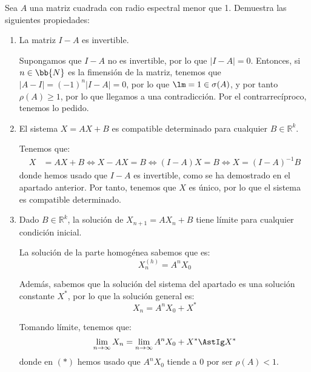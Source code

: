 \begin{ejercicio}
Sea $A$ una matriz cuadrada con radio espectral menor que 1. Demuestra las siguientes propiedades:

\begin{enumerate}
    \item La matriz $I - A$ es invertible.
    
    Supongamos que $I-A$ no es invertible, por lo que $|I-A|=0$.
    Entonces, si $n\in \bb{N}$ es la fimensión de la matriz, tenemos que $|A-I|=(-1)^n|I-A| = 0$,
    por lo que $\lm=1\in \sigma(A)$, y por tanto $\rho(A)\geq 1$, por lo que llegamos a una contradicción.
    Por el contrarrecíproco, tenemos lo pedido.
    \item El sistema $X = AX + B$ es compatible determinado para cualquier $B \in \mathbb{R}^k$.
    
    Tenemos que:
    \begin{align*}
        X &= AX + B \Longleftrightarrow
        X - AX = B \Longleftrightarrow
        (I - A)X = B \Longleftrightarrow
        X = (I - A)^{-1}B
    \end{align*}
    donde hemos usado que $I - A$ es invertible, como se ha demostrado en el apartado anterior.
    Por tanto, tenemos que $X$ es único, por lo que el sistema es compatible determinado.

    \item Dado $B \in \mathbb{R}^k$, la solución de $X_{n+1} = AX_n + B$ tiene límite para cualquier condición inicial.
    
    La solución de la parte homogénea sabemos que es:
    \begin{equation*}
        X_n^{(h)} = A^nX_0
    \end{equation*}

    Además, sabemos que la solución del sistema del apartado es una solución constante $X^\ast$,
    por lo que la solución general es:
    \begin{equation*}
        X_n = A^nX_0 + X^\ast
    \end{equation*}

    Tomando límite, tenemos que:
    \begin{equation*}
        \lim_{n\to\infty}X_n = \lim_{n\to\infty}A^nX_0 + X^\ast
        \AstIg X^\ast
    \end{equation*}
    donde en $(\ast)$ hemos usado que $A^nX_0$ tiende a 0 por ser $\rho(A) < 1$.
\end{enumerate}
\end{ejercicio}

